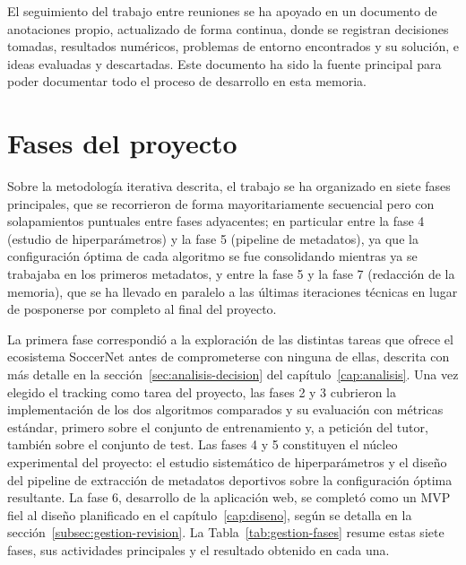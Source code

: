 El seguimiento del trabajo entre reuniones se ha apoyado en un documento de
anotaciones propio, actualizado de forma continua, donde se registran
decisiones tomadas, resultados numéricos, problemas de entorno encontrados
y su solución, e ideas evaluadas y descartadas. Este documento ha sido la fuente principal para poder
documentar todo el proceso de desarrollo en esta memoria.

\section{Fases del proyecto}
\label{sec:gestion-fases}

Sobre la metodología iterativa descrita, el trabajo se ha organizado en
siete fases principales, que se recorrieron de forma mayoritariamente
secuencial pero con solapamientos puntuales entre fases adyacentes; en
particular entre la fase 4 (estudio de hiperparámetros) y la fase 5
(pipeline de metadatos), ya que la configuración óptima de cada algoritmo
se fue consolidando mientras ya se trabajaba en los primeros metadatos, y
entre la fase 5 y la fase 7 (redacción de la memoria), que se ha llevado en
paralelo a las últimas iteraciones técnicas en lugar de posponerse por
completo al final del proyecto.

La primera fase correspondió a la exploración de las distintas tareas que
ofrece el ecosistema SoccerNet antes de comprometerse con ninguna de ellas,
descrita con más detalle en la sección~\ref{sec:analisis-decision} del
capítulo~\ref{cap:analisis}. Una vez elegido el tracking como tarea del
proyecto, las fases 2 y 3 cubrieron la implementación de los dos algoritmos
comparados y su evaluación con métricas estándar, primero sobre el
conjunto de entrenamiento y, a petición del tutor, también sobre el
conjunto de test. Las fases 4 y 5 constituyen el núcleo experimental del
proyecto: el estudio sistemático de hiperparámetros y el diseño del
pipeline de extracción de metadatos deportivos sobre la configuración
óptima resultante. La fase 6, desarrollo de la aplicación web, se completó
como un MVP fiel al diseño planificado en el capítulo~\ref{cap:diseno},
según se detalla en la sección~\ref{subsec:gestion-revision}. La
Tabla~\ref{tab:gestion-fases} resume estas siete fases, sus actividades
principales y el resultado obtenido en cada una.

